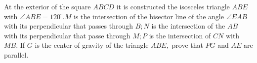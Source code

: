At the exterior of the square $ ABCD $ it is constructed the isosceles triangle $ ABE $ with $ \angle ABE=120^{\circ} . M $ is the intersection of the bisector line of the angle $ \angle EAB $ with its perpendicular that passes through $ B; N $ is the intersection of the $ AB $ with its perpendicular that passe through $ M; P $ is the intersection of $ CN $ with $ MB. $
If $ G $ is the center of gravity of the triangle $ ABE, $ prove that $ PG $ and $ AE $ are parallel.